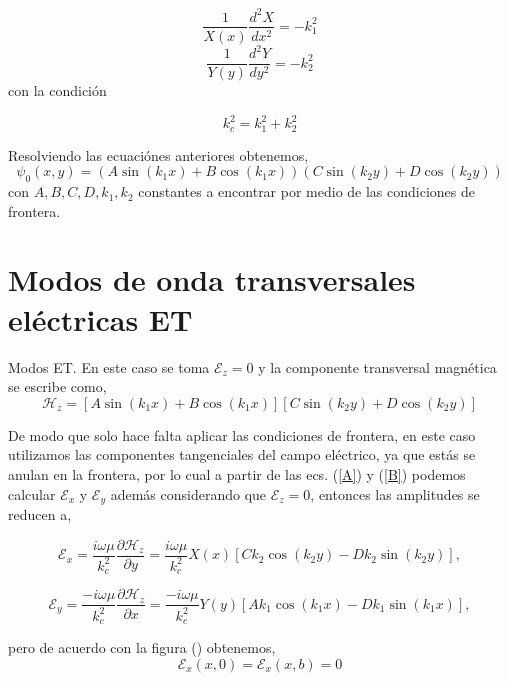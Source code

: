 \documentclass[11pt,fleqn]{book} %
\begin{document}
  \begin{equation*}
  \frac{1}{X(x)}\frac{d^2X}{dx^2}=-k_1^2
  \end{equation*}
\begin{equation*}
\frac{1}{Y(y)}\frac{d^2Y}{dy^2}=-k_2^2
\end{equation*}
 con la condici\'on

 \begin{equation}  \label{condicion}
  k_c^2=k_1^2+k_2^2
  \end{equation}

 Resolviendo las ecuaci\'ones anteriores obtenemos,
   \begin{equation}
   \psi_0(x,y)=(A\sin(k_1x)+B\cos(k_1x))(C\sin(k_2y)+D\cos(k_2y))
   \end{equation}
   con $A,B,C,D,k_1, k_2$ constantes a encontrar por medio de las condiciones de frontera.

\section{Modos de onda 	transversales el\'ectricas ET}


   Modos ET. En este caso se toma $\mathcal{E}_z=0$ y la componente transversal magn\'etica se escribe como,
   \begin{equation}
   \mathcal{H}_z=[A\sin(k_1x)+B\cos(k_1x)][C\sin(k_2y)+D\cos(k_2y)]
   \end{equation}

   De modo que solo hace falta aplicar las condiciones de frontera, en este caso utilizamos las componentes tangenciales del campo el\'ectrico, ya que est\'as se anulan en la frontera, por lo cual a partir de las ecs. (\ref{A}) y (\ref{B}) podemos calcular $\mathcal{E}_x$ y $\mathcal{E}_y$ adem\'as considerando que $\mathcal{E}_z=0$, entonces las amplitudes se reducen a,

   \begin{equation*}
     \mathcal{E}_x=\frac{i\omega\mu}{k_c^2}\frac{\partial \mathcal{H}_z}{\partial y}=\frac{i\omega\mu}{k_c^2}X(x)[Ck_2\cos(k_2y)-Dk_2\sin(k_2 y)],
     \end{equation*}

   \begin{equation*}
     \mathcal{E}_y=\frac{-i\omega\mu}{k_c^2}\frac{\partial \mathcal{H}_z}{\partial x}=\frac{-i\omega\mu}{k_c^2}Y(y)[Ak_1\cos(k_1x)-Dk_1\sin(k_1 x)],
     \end{equation*}

pero de acuerdo con la figura () obtenemos,
\begin{equation*}
    \mathcal{E}_x(x,0)=\mathcal{E}_x(x,b)=0
    \end{equation*}
\end{document}
